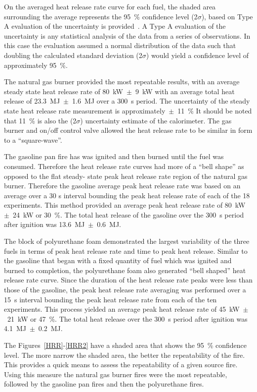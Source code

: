 \documentclass[twoside]{uocthesis}
\begin{document}
{On the averaged heat release rate curve for each fuel, the shaded area surrounding the average represents the 95~\% confidence level (2$\sigma$), based on Type A evaluation of the uncertainty is provided~\cite{Taylor:1994}.  A Type A evaluation of the uncertainty is any statistical analysis of the data from a series of observations.  In this case the evaluation assumed a normal distribution of the data such that doubling the calculated standard deviation (2$\sigma$) would yield a confidence level of approximately 95~\%.

The natural gas burner provided the most repeatable results, with an average steady state heat release rate of 80~kW~$\pm$~9~kW with an average total heat release of 23.3~MJ~$\pm$~1.6~MJ over a 300~s period. The uncertainty of the steady state heat release rate measurement is approximately~$\pm$~11~\% It should be noted that 11~\% is also the (2$\sigma$) uncertainty estimate of the calorimeter. The gas burner and on/off control valve allowed the heat release rate to be similar in form to a ``square-wave''. 

The gasoline pan fire has was ignited and then burned until the fuel was consumed.  Therefore the heat release rate curves had more of a ``bell shape''  as opposed to the flat steady- state peak heat release rate region of the natural gas burner.  Therefore the  gasoline average peak heat release rate was based on an average over a 30 s interval bounding the peak heat release rate of each of the 18 experiments.  This method provided an average peak heat release rate of 80~kW~$\pm$~24~kW or 30~\%.  The total heat release of the gasoline over the 300~s period after ignition was 13.6~MJ~$\pm$~0.6~MJ.  

The block of polyurethane foam demonstrated the largest variability of the three fuels in terms of peak heat release rate and time to peak heat release. Similar to the gasoline that began with a fixed quantity of fuel which was ignited and burned to completion, the polyurethane foam also generated ``bell shaped'' heat release rate curve.  Since the duration of the heat release rate peaks were less than those of the gasoline, the peak heat release rate averaging was performed over a 15~s interval bounding the peak heat release rate from each of the ten experiments.  This process yielded an average peak heat release rate of 45~kW~$\pm$~21~kW or 47~\%.  The total heat release over the 300~s period after ignition was 4.1~MJ~$\pm$~0.2~MJ. 

The Figures~\ref{HRR}-\ref{HRR2} have a shaded area that shows the 95~\% confidence level.  The more narrow the shaded area, the better the repeatability of the fire.  This provides a quick means to assess the repeatability of a given source fire.  Using this measure the natural gas burner fires were the most repeatable, followed by the gasoline pan fires and then the polyurethane fires.       


}
\end{document}
